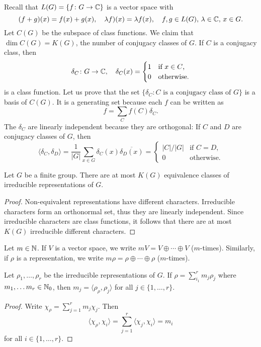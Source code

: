 Recall that $L(G)=\{f\colon G\to\mathbb{C}\}$ is a vector space with
\[
    (f+g)(x)=f(x)+g(x),
    \quad
    \lambda f)(x)=\lambda f(x),
    \quad 
    f,g\in L(G),\,\lambda\in\mathbb{C},\,x\in G.
\]
Let $C(G)$ be the subspace of class functions. 
We claim that $\dim C(G)=K(G)$, the number of conjugacy classes of $G$. If $C$ is a conjugacy class, 
then 
\[
\delta_C\colon G\to\mathbb{C},\quad
\delta_C(x)=\begin{cases}
    1 & \text{if $x\in C$,}\\
    0 & \text{otherwise.}
\end{cases}
\]
is a class function. Let us prove that the 
set $\{\delta_C:C\text{ is a conjugacy class of $G$}\}$ is a basis of $C(G)$.  It is a generating set
because each $f$ can be written as 
\[
f=\sum_{C}f(C)\delta_C.
\]
The $\delta_C$ are linearly independent because they are orthogonal: 
If $C$ and $D$ 
are conjugacy classes of $G$, then 
\[
\langle\delta_C,\delta_D\rangle=\frac{1}{|G|}\sum_{x\in G}\delta_C(x)\overline{\delta_D(x)}
=\begin{cases}
|C|/|G| & \text{if $C=D$},\\
0 & \text{otherwise}.
\end{cases}
\]

\begin{corollary}
    Let $G$ be a finite group. There are at most $K(G)$ equivalence classes of irreducible representations of $G$.
\end{corollary}

\begin{proof}
    Non-equivalent representations have different characters. 
    Irreducible characters 
    form an orthonormal set, thus they are linearly 
    independent. Since irreducible characters
    are class functions, it follows that there are at most $K(G)$ irreducible different characters.  
\end{proof}

Let $m\in\mathbb{N}$. If $V$ is a vector space, we 
write $mV=V\oplus\cdots\oplus V$ ($m$-times). Similarly,
if $\rho$ is a representation, 
we write $m\rho=\rho\oplus\cdots\oplus\rho$ ($m$-times). 


\begin{theorem}
    Let $\rho_1,\dots,\rho_r$ be the irreducible representations of $G$. If 
    $\rho=\sum_{i_1}^rm_j\rho_j$ where $m_1,\dots m_r\in\mathbb{N}_0$, then
    $m_j=\langle \rho_\rho,\rho_j\rangle$ for all $j\in\{1,\dots,r\}$. 
\end{theorem}

\begin{proof}
    Write $\chi_\rho=\sum_{j=1}^rm_j\chi_j$. Then
    \[
    \langle\chi_\rho,\chi_i\rangle=\sum_{j=1}^r\langle\chi_j,\chi_i\rangle=m_i
    \]
    for all $i\in\{1,\dots,r\}$.
\end{proof}

